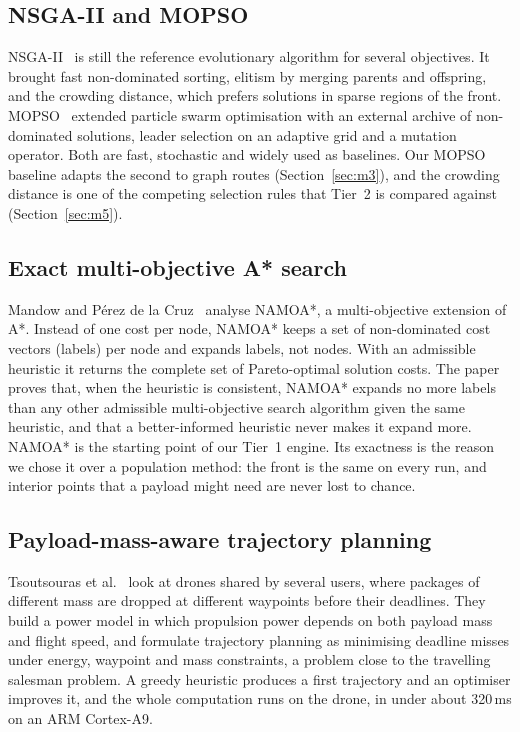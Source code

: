\subsection{NSGA-II and MOPSO}

NSGA-II~\cite{r8} is still the reference evolutionary algorithm for several objectives.
It brought fast non-dominated sorting, elitism by merging parents and offspring, and the
crowding distance, which prefers solutions in sparse regions of the front. MOPSO~\cite{r6}
extended particle swarm optimisation with an external archive of non-dominated
solutions, leader selection on an adaptive grid and a mutation operator. Both are fast,
stochastic and widely used as baselines. Our MOPSO baseline adapts the second to graph
routes (Section~\ref{sec:m3}), and the crowding distance is one of the competing
selection rules that Tier~2 is compared against (Section~\ref{sec:m5}).

\subsection{Exact multi-objective A* search}

Mandow and P\'{e}rez de la Cruz~\cite{r17} analyse NAMOA*, a multi-objective extension
of A*. Instead of one cost per node, NAMOA* keeps a set of non-dominated cost vectors
(labels) per node and expands labels, not nodes. With an admissible heuristic it returns
the complete set of Pareto-optimal solution costs. The paper proves that, when the heuristic is
consistent, NAMOA* expands no more labels than any other admissible multi-objective
search algorithm given the same heuristic, and that a better-informed heuristic never
makes it expand more. NAMOA* is the starting point of our Tier~1 engine. Its
exactness is the reason we chose it over a population method: the front is the same on
every run, and interior points that a payload might need are never lost to chance.

\subsection{Payload-mass-aware trajectory planning}

Tsoutsouras et al.~\cite{r10} look at drones shared by several users, where packages of
different mass are dropped at different waypoints before their deadlines. They build a
power model in which propulsion power depends on both payload mass and flight speed,
and formulate trajectory planning as minimising deadline misses under energy,
waypoint and mass constraints, a problem close to the travelling salesman problem. A
greedy heuristic produces a first trajectory and an optimiser improves it, and the whole
computation runs on the drone, in under about 320\,ms on an ARM Cortex-A9.

